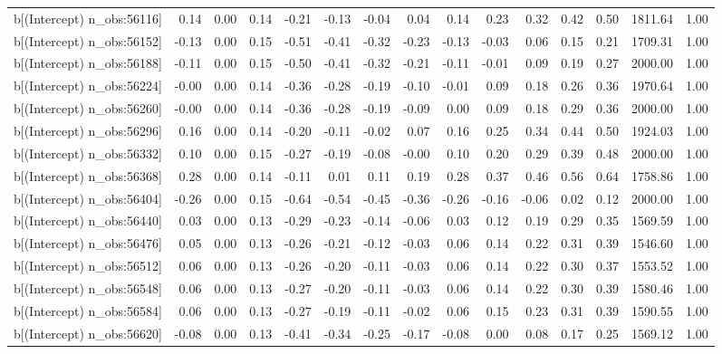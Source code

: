 \begin{table}[ht]
\begin{tabular}{rrrrrrrrrrrrrrr}
  b[(Intercept) n\_obs:56116] & 0.14 & 0.00 & 0.14 & -0.21 & -0.13 & -0.04 & 0.04 & 0.14 & 0.23 & 0.32 & 0.42 & 0.50 & 1811.64 & 1.00 \\ 
  b[(Intercept) n\_obs:56152] & -0.13 & 0.00 & 0.15 & -0.51 & -0.41 & -0.32 & -0.23 & -0.13 & -0.03 & 0.06 & 0.15 & 0.21 & 1709.31 & 1.00 \\ 
  b[(Intercept) n\_obs:56188] & -0.11 & 0.00 & 0.15 & -0.50 & -0.41 & -0.32 & -0.21 & -0.11 & -0.01 & 0.09 & 0.19 & 0.27 & 2000.00 & 1.00 \\ 
  b[(Intercept) n\_obs:56224] & -0.00 & 0.00 & 0.14 & -0.36 & -0.28 & -0.19 & -0.10 & -0.01 & 0.09 & 0.18 & 0.26 & 0.36 & 1970.64 & 1.00 \\ 
  b[(Intercept) n\_obs:56260] & -0.00 & 0.00 & 0.14 & -0.36 & -0.28 & -0.19 & -0.09 & 0.00 & 0.09 & 0.18 & 0.29 & 0.36 & 2000.00 & 1.00 \\ 
  b[(Intercept) n\_obs:56296] & 0.16 & 0.00 & 0.14 & -0.20 & -0.11 & -0.02 & 0.07 & 0.16 & 0.25 & 0.34 & 0.44 & 0.50 & 1924.03 & 1.00 \\ 
  b[(Intercept) n\_obs:56332] & 0.10 & 0.00 & 0.15 & -0.27 & -0.19 & -0.08 & -0.00 & 0.10 & 0.20 & 0.29 & 0.39 & 0.48 & 2000.00 & 1.00 \\ 
  b[(Intercept) n\_obs:56368] & 0.28 & 0.00 & 0.14 & -0.11 & 0.01 & 0.11 & 0.19 & 0.28 & 0.37 & 0.46 & 0.56 & 0.64 & 1758.86 & 1.00 \\ 
  b[(Intercept) n\_obs:56404] & -0.26 & 0.00 & 0.15 & -0.64 & -0.54 & -0.45 & -0.36 & -0.26 & -0.16 & -0.06 & 0.02 & 0.12 & 2000.00 & 1.00 \\ 
  b[(Intercept) n\_obs:56440] & 0.03 & 0.00 & 0.13 & -0.29 & -0.23 & -0.14 & -0.06 & 0.03 & 0.12 & 0.19 & 0.29 & 0.35 & 1569.59 & 1.00 \\ 
  b[(Intercept) n\_obs:56476] & 0.05 & 0.00 & 0.13 & -0.26 & -0.21 & -0.12 & -0.03 & 0.06 & 0.14 & 0.22 & 0.31 & 0.39 & 1546.60 & 1.00 \\ 
  b[(Intercept) n\_obs:56512] & 0.06 & 0.00 & 0.13 & -0.26 & -0.20 & -0.11 & -0.03 & 0.06 & 0.14 & 0.22 & 0.30 & 0.37 & 1553.52 & 1.00 \\ 
  b[(Intercept) n\_obs:56548] & 0.06 & 0.00 & 0.13 & -0.27 & -0.20 & -0.11 & -0.03 & 0.06 & 0.14 & 0.22 & 0.30 & 0.39 & 1580.46 & 1.00 \\ 
  b[(Intercept) n\_obs:56584] & 0.06 & 0.00 & 0.13 & -0.27 & -0.19 & -0.11 & -0.02 & 0.06 & 0.15 & 0.23 & 0.31 & 0.39 & 1590.55 & 1.00 \\ 
  b[(Intercept) n\_obs:56620] & -0.08 & 0.00 & 0.13 & -0.41 & -0.34 & -0.25 & -0.17 & -0.08 & 0.00 & 0.08 & 0.17 & 0.25 & 1569.12 & 1.00 \\ 

\end{tabular}
\end{table}
